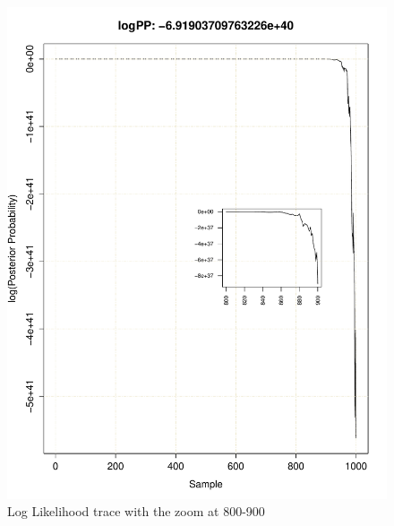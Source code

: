 \documentclass[11pt]{labbook}
\begin{document}
    \begin{figure}
        \centering
        \includegraphics[scale=.75]{FONSE_Plots/2016/June_29/LogLikeTrace_800-900}
        \caption{Log Likelihood trace with the zoom at 800-900}
        \label{fig:JUN29_800-900}
    \end{figure}
\end{document}
